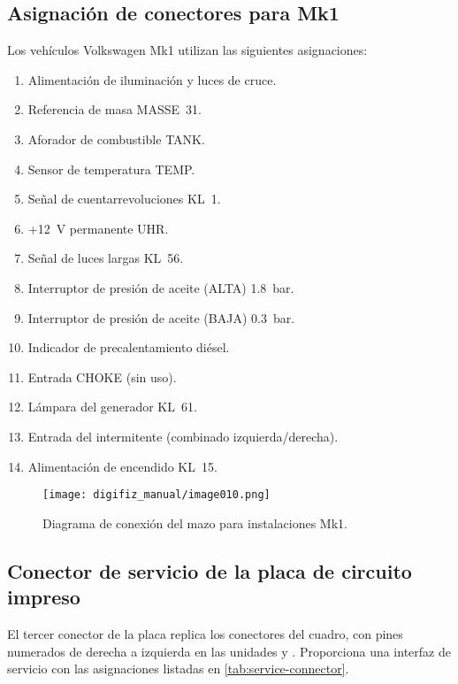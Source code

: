 \subsection{Asignación de conectores para Mk1}
Los vehículos Volkswagen Mk1 utilizan las siguientes asignaciones:
\begin{enumerate}
    \item Alimentación de iluminación y luces de cruce.
    \item Referencia de masa MASSE~31.
    \item Aforador de combustible TANK.
    \item Sensor de temperatura TEMP.
    \item Señal de cuentarrevoluciones KL~1.
    \item +12~V permanente UHR.
    \item Señal de luces largas KL~56.
    \item Interruptor de presión de aceite (ALTA) 1.8~bar.
    \item Interruptor de presión de aceite (BAJA) 0.3~bar.
    \item Indicador de precalentamiento diésel.
    \item Entrada CHOKE (sin uso).
    \item Lámpara del generador KL~61.
    \item Entrada del intermitente (combinado izquierda/derecha).
    \item Alimentación de encendido KL~15.
\end{enumerate}
\begin{figure}[htbp]
    \centering
    \texttt{[image: digifiz\_manual/image010.png]}
    \caption{Diagrama de conexión del mazo para instalaciones Mk1.}
\end{figure}

\subsection{Conector de servicio de la placa de circuito impreso}
El tercer conector de la placa replica los conectores del cuadro, con pines numerados de derecha a izquierda en las unidades \ReplicaGenOneShort{} y \ReplicaNextShort{}. Proporciona una interfaz de servicio con las asignaciones listadas en \autoref{tab:service-connector}.

